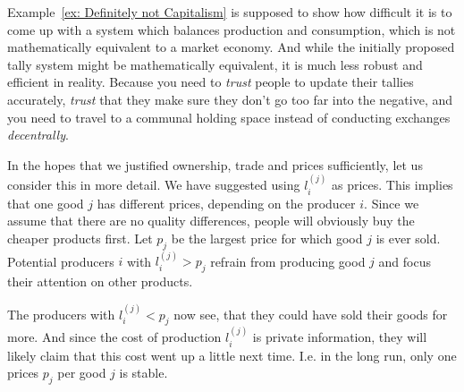 \begin{remark}
	Example~\ref{ex: Definitely not Capitalism} is supposed to show how difficult
	it is to come up with a system which balances production and consumption,
	which is not mathematically equivalent to a market economy. And while the
	initially proposed tally system might be mathematically equivalent, it is
	much less robust and efficient in reality. Because you need to \emph{trust}
	people to update their tallies accurately, \emph{trust} that they make sure
	they don't go too far into the negative, and you need to travel to a
	communal holding space instead of conducting exchanges \emph{decentrally}.
\end{remark}

In the hopes that we justified ownership, trade and prices sufficiently, let us
consider this in more detail. We have suggested using \(l^{(j)}_i\) as prices.
This implies that one good \(j\) has different prices, depending on the producer
\(i\). Since we assume that there are no quality differences, people will
obviously buy the cheaper products first. Let \(p_j\) be the largest price for
which good \(j\) is ever sold. Potential producers \(i\) with \(l^{(j)}_i > p_j\)
refrain from producing good \(j\) and focus their attention on other products.

The producers with \(l^{(j)}_i < p_j\) now see, that they could have sold their
goods for more. And since the cost of production \(l^{(j)}_i\) is private
information, they will likely claim that this cost went up a little next time.
I.e. in the long run, only one prices \(p_j\) per good \(j\) is stable.
